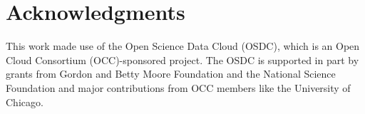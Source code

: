 \documentclass[letterpaper]{article}
\begin{document}

\section{Acknowledgments}
This work made use of the Open Science Data Cloud (OSDC), which is an Open Cloud Consortium (OCC)-sponsored project. 
The OSDC is supported in part by grants from Gordon and Betty Moore Foundation and the National Science Foundation and major contributions from OCC members like the University of Chicago. 

%

\end{document}
